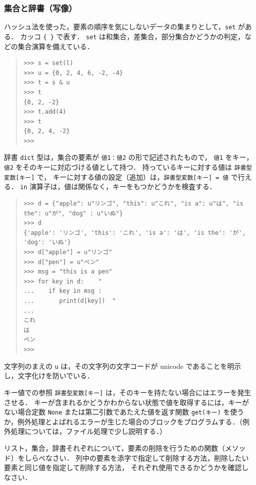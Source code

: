 \documentclass[11pt,a4,epsf]{report}
\begin{document}
\subsubsection{集合と辞書（写像）}

ハッシュ法を使った，要素の順序を気にしないデータの集まりとして，\verb+set+ がある．
カッコ \verb+{ }+ で表す．
\verb+set+ は和集合，差集合，部分集合かどうかの判定，などの集合演算を備えている．
\begin{quote}
\small
\begin{verbatim}
>>> s = set(l)
>>> u = {0, 2, 4, 6, -2, -4}
>>> t = s & u
>>> t
{0, 2, -2}
>>> t.add(4)
>>> t
{0, 2, 4, -2}
>>>
\end{verbatim}
\end{quote}

辞書 \verb+dict+ 型は，集合の要素が \verb+値1：値2+ の形で記述されたもので，
 \verb+値1+ をキー，\verb+値2+ をそのキーに対応づける値として持つ．
持っているキーに対する値は \verb+辞書型変数[キー]+ で，
キーに対する値の設定（追加）は，\verb+辞書型変数[キー] = 値+ で行える．
\verb+in+ 演算子は，値は関係なく，キーをもつかどうかを検査する．
\begin{quote}
\small
\begin{verbatim}
>>> d = {"apple": u"リンゴ", "this": u"これ", "is a": u"は", "is the": u"が", "dog" : u"いぬ"}
>>> d
{'apple': 'リンゴ', 'this': 'これ', 'is a': 'は', 'is the': 'が', 'dog': 'いぬ'}
>>> d["apple"] = u"リンゴ"
>>> d["pen"] = u"ペン"
>>> msg = "this is a pen"
>>> for key in d:    "
...    if key in msg :
...       print(d[key])  "
...
これ
は
ペン
>>>
\end{verbatim}
\end{quote}
文字列のまえの \verb+u+ は，その文字列の文字コードが unicode であることを明示し，文字化けを防いでいる．

キー値での参照 \verb+辞書型変数[キー]+ は，そのキーを持たない場合にはエラーを発生させる．
キーが含まれるかどうかわからない状態で値を取得するには，キーがない場合定数 \verb+None+ または第二引数であたえた値を返す関数 \verb+get(キー)+ を使うか，例外処理とよばれるエラーが生じた場合のブロックをプログラムする．（例外処理については，ファイル処理で少し説明する．）

\begin{excercise}
リスト，集合，辞書それぞれについて，要素の削除を行うための関数（メソッド）をしらべなさい．
列中の要素を添字で指定して削除する方法，削除したい要素と同じ値を指定して削除する方法，
それぞれ使用できるかどうかを確認しなさい．
\end{excercise}
\end{document}

